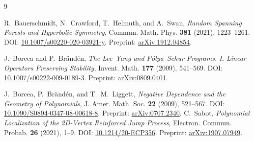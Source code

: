 \documentclass[11pt]{article}
\theoremstyle{definition}
\theoremstyle{remark}
\newcommand{\1}{\mathbf 1}
\begin{document}
\begin{thebibliography}{9}

R.~Bauerschmidt, N.~Crawford, T.~Helmuth, and A.~Swan,
\emph{Random Spanning Forests and Hyperbolic Symmetry},
Commun. Math. Phys. \textbf{381} (2021), 1223--1261.
DOI: \href{https://doi.org/10.1007/s00220-020-03921-y}{10.1007/s00220-020-03921-y}.
Preprint: \href{https://arxiv.org/abs/1912.04854}{arXiv:1912.04854}.

J.~Borcea and P.~Br\"and\'en,
\emph{The Lee--Yang and P\'olya--Schur Programs. I. Linear Operators Preserving Stability},
Invent. Math. \textbf{177} (2009), 541--569.
DOI: \href{https://doi.org/10.1007/s00222-009-0189-3}{10.1007/s00222-009-0189-3}.
Preprint: \href{https://arxiv.org/abs/0809.0401}{arXiv:0809.0401}.

J.~Borcea, P.~Br\"and\'en, and T.~M.~Liggett,
\emph{Negative Dependence and the Geometry of Polynomials},
J. Amer. Math. Soc. \textbf{22} (2009), 521--567.
DOI: \href{https://doi.org/10.1090/S0894-0347-08-00618-8}{10.1090/S0894-0347-08-00618-8}.
Preprint: \href{https://arxiv.org/abs/0707.2340}{arXiv:0707.2340}.
 C.~Sabot, \emph{Polynomial Localization of the 2D-Vertex Reinforced Jump Process}, Electron. Commun. Probab. \textbf{26} (2021), 1--9. DOI: \href{https://doi.org/10.1214/20-ECP356}{10.1214/20-ECP356}. Preprint: \href{https://arxiv.org/abs/1907.07949}{arXiv:1907.07949}.
\end{thebibliography}
\end{document}
